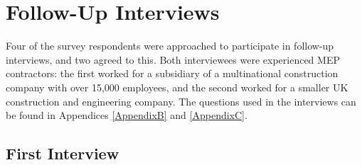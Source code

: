 
\section{Follow-Up Interviews}

Four of the survey respondents were approached to participate in follow-up interviews, and two agreed to this.
Both interviewees were experienced MEP contractors: the first worked for a subsidiary of a multinational construction company with over 15,000 employees, and the second worked for a smaller UK construction and engineering company.
The questions used in the interviews can be found in Appendices \ref{AppendixB} and \ref{AppendixC}.

\subsection{First Interview}

